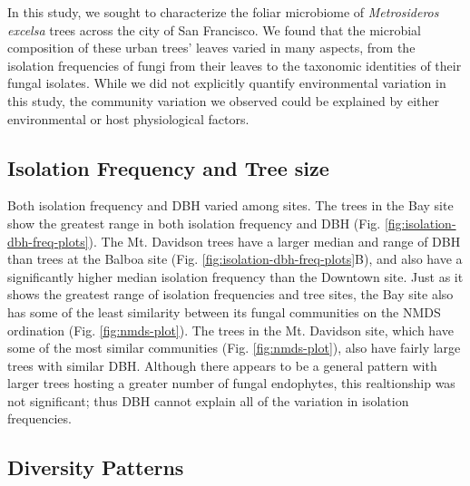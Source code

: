 \documentclass[fleqn,10pt,lineno]{wlpeerj} %
\begin{document}
In this study, we sought to characterize the foliar microbiome of \emph{Metrosideros excelsa} trees across the city of San Francisco. We found that the microbial composition of these urban trees' leaves varied in many aspects, from the isolation frequencies of fungi from their leaves to the taxonomic identities of their fungal isolates. While we did not explicitly quantify environmental variation in this study, the community variation we observed could be explained by either environmental or host physiological factors.

\hypertarget{isolation-frequency-and-tree-size}{%
\subsection*{Isolation Frequency and Tree size}\label{isolation-frequency-and-tree-size}}

Both isolation frequency and DBH varied among sites. The trees in the Bay site show the greatest range in both isolation frequency and DBH (Fig. \ref{fig:isolation-dbh-freq-plots}). The Mt. Davidson trees have a larger median and range of DBH than trees at the Balboa site (Fig. \ref{fig:isolation-dbh-freq-plots}B), and also have a significantly higher median isolation frequency than the Downtown site. Just as it shows the greatest range of isolation frequencies and tree sites, the Bay site also has some of the least similarity between its fungal communities on the NMDS ordination (Fig. \ref{fig:nmds-plot}). The trees in the Mt. Davidson site, which have some of the most similar communities (Fig. \ref{fig:nmds-plot}), also have fairly large trees with similar DBH. Although there appears to be a general pattern with larger trees hosting a greater number of fungal endophytes, this realtionship was not significant; thus DBH cannot explain all of the variation in isolation frequencies.

\hypertarget{diversity-patterns-1}{%
\subsection*{Diversity Patterns}\label{diversity-patterns-1}}
\end{document}
